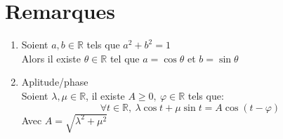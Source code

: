 \documentclass[fleqn]{article}
\theoremstyle{definition} \newtheorem*{defi}{D\'efinition}
\theoremstyle{definition} \newtheorem*{theo}{Th\'eor\`eme}
\theoremstyle{definition} \newtheorem*{prop}{Propri\'et\'e}
\theoremstyle{remark} \newtheorem*{rqs}{Remarques}
\begin{document}
\section{Remarques}
\begin{enumerate}
	\item Soient $a,b \in \mathbb{R}$ tels que $a^2 + b^2 = 1$\\
		Alors il existe $\theta \in \mathbb{R}$ tel que $a = \cos \theta$ et $b = \sin \theta$
	\item Aplitude/phase \\
		Soient $\lambda, \mu \in \mathbb{R}$, il existe $A \geq 0,\ \varphi \in \mathbb{R}$ tels que:
		\[\forall t \in \mathbb{R},\ \lambda \cos t + \mu \sin t = A\cos(t - \varphi)\]
		Avec $A = \sqrt{\lambda^2 + \mu^2}$
\end{enumerate}
\end{document}
